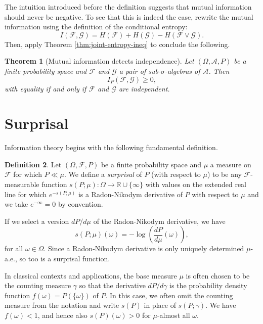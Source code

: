 \documentclass[11pt]{book}
\newtheorem{thm}{Theorem}[section]
\theoremstyle{definition}
\newtheorem{defn}[thm]{Definition}
\numberwithin{equation}{section}
\begin{document}
The intuition introduced before the definition suggests that mutual information should never be negative. To see that this is indeed the case, rewrite the mutual information using the definition of the conditional entropy:
\[
	I(\mathcal{F},\mathcal{G}) = H(\mathcal{F}) + H(\mathcal{G}) - H(\mathcal{F} \vee \mathcal{G}).
\]
Then, apply Theorem \ref{thm:joint-entropy-ineq} to conclude the following.

\begin{thm}[Mutual information detects independence]\label{thm:mutual-info-ineq}
	Let $(\Omega,\mathcal{A},P)$ be a finite probability space and $\mathcal{F}$ and $\mathcal{G}$ a pair of sub-$\sigma$-algebras of $\mathcal{A}$. Then
	\[
		I_P(\mathcal{F}, \mathcal{G}) \geq 0,
	\]
	with equality if and only if $\mathcal{F}$ and $\mathcal{G}$ are independent.
\end{thm}



\section{Surprisal}

Information theory begins with the following fundamental definition.

\begin{defn}
	Let $(\Omega,\mathcal{F},P)$ be a finite probability space and $\mu$ a measure on $\mathcal{F}$ for which $P \ll \mu$. We define a \textit{surprisal} of $P$ (with respect to $\mu$) to be any $\mathcal{F}$-measurable function $s(P;\mu): \Omega \to \mathbb{R} \cup \{\infty\}$ with values on the extended real line for which $e^{-s(P;\mu)}$ is a Radon-Nikodym derivative of $P$ with respect to $\mu$ and we take $e^{-\infty} = 0$ by convention.
\end{defn}

If we select a version $dP/d\mu$ of the Radon-Nikodym derivative, we have
\[s(P;\mu)(\omega) = -\log{ \left( \frac{dP}{d\mu}(\omega) \right)},
\]
for all $\omega \in \Omega$. Since a Radon-Nikodym derivative is only uniquely determined $\mu$-a.e., so too is a surprisal function.

In classical contexts and applications, the base measure $\mu$ is often chosen to be the counting measure $\gamma$ so that the derivative $dP/d\gamma$ is the probability density function $f(\omega) = P(\{\omega\})$ of $P$. In this case, we often omit the counting measure from the notation and write $s(P)$ in place of $s(P;\gamma)$. We have $f(\omega) < 1$, and hence also $s(P)(\omega) > 0$ for $\mu$-almost all $\omega$.
\end{document}
